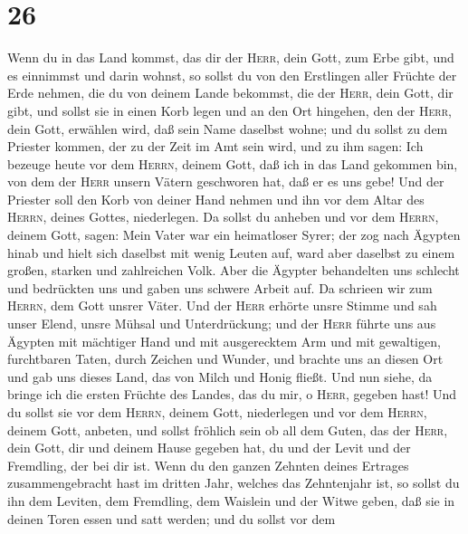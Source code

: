 \hypertarget{section-25}{%
\section{26}\label{section-25}}

 Wenn du in das Land kommst, das dir der \textsc{Herr},
dein Gott, zum Erbe gibt, und es einnimmst und darin wohnst,
 so sollst du von den Erstlingen aller Früchte der Erde
nehmen, die du von deinem Lande bekommst, die der \textsc{Herr}, dein
Gott, dir gibt, und sollst sie in einen Korb legen und an den Ort
hingehen, den der \textsc{Herr}, dein Gott, erwählen wird, daß sein Name
daselbst wohne;  und du sollst zu dem Priester kommen, der
zu der Zeit im Amt sein wird, und zu ihm sagen: Ich bezeuge heute vor
dem \textsc{Herrn}, deinem Gott, daß ich in das Land gekommen bin, von
dem der \textsc{Herr} unsern Vätern geschworen hat, daß er es uns gebe!
 Und der Priester soll den Korb von deiner Hand nehmen und
ihn vor dem Altar des \textsc{Herrn}, deines Gottes, niederlegen.
 Da sollst du anheben und vor dem \textsc{Herrn}, deinem
Gott, sagen: Mein Vater war ein heimatloser Syrer; der zog nach Ägypten
hinab und hielt sich daselbst mit wenig Leuten auf, ward aber daselbst
zu einem großen, starken und zahlreichen Volk.  Aber die
Ägypter behandelten uns schlecht und bedrückten uns und gaben uns
schwere Arbeit auf.  Da schrieen wir zum \textsc{Herrn},
dem Gott unsrer Väter. Und der \textsc{Herr} erhörte unsre Stimme und
sah unser Elend,  unsre Mühsal und Unterdrückung; und der
\textsc{Herr} führte uns aus Ägypten mit mächtiger Hand und mit
ausgerecktem Arm und mit gewaltigen, furchtbaren Taten, durch Zeichen
und Wunder,  und brachte uns an diesen Ort und gab uns
dieses Land, das von Milch und Honig fließt.  Und nun
siehe, da bringe ich die ersten Früchte des Landes, das du mir, o
\textsc{Herr}, gegeben hast! Und du sollst sie vor dem \textsc{Herrn},
deinem Gott, niederlegen und vor dem \textsc{Herrn}, deinem Gott,
anbeten,  und sollst fröhlich sein ob all dem Guten, das
der \textsc{Herr}, dein Gott, dir und deinem Hause gegeben hat, du und
der Levit und der Fremdling, der bei dir ist.  Wenn du
den ganzen Zehnten deines Ertrages zusammengebracht hast im dritten
Jahr, welches das Zehntenjahr ist, so sollst du ihn dem Leviten, dem
Fremdling, dem Waislein und der Witwe geben, daß sie in deinen Toren
essen und satt werden;  und du sollst vor dem
